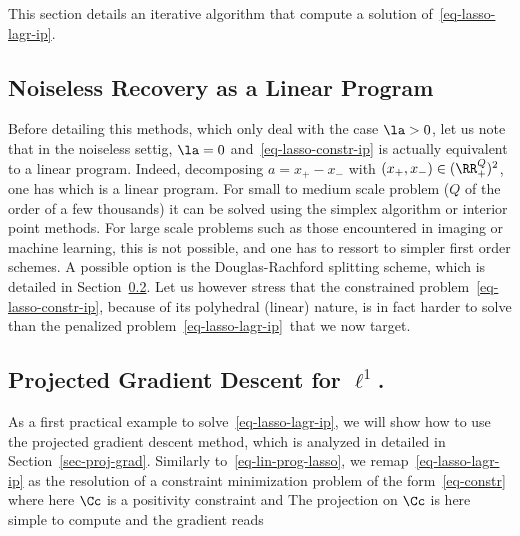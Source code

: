 This section details an iterative algorithm that compute a solution of~\eqref{eq-lasso-lagr-ip}.

\subsection{Noiseless Recovery as a Linear Program}
\label{eq-linearprog-lasso}

Before detailing this methods, which only deal with the case $\la>0$, let us note that in the noiseless settig, $\la=0$ and~\eqref{eq-lasso-constr-ip} is actually equivalent to a linear program. Indeed, decomposing $a=x_+-x_-$ with $(x_+,x_-) \in (\RR_+^Q)^2$, one has
which is a linear program. For small to medium scale problem ($Q$ of the order of a few thousands) it can be solved using the simplex algorithm or interior point methods. 
%
For large scale problems such as those encountered in imaging or machine learning, this is not possible, and one has to ressort to simpler first order schemes. A possible option is the Douglas-Rachford splitting scheme, which is detailed in Section~\ref{}.
%
Let us however stress that the constrained problem~\eqref{eq-lasso-constr-ip}, because of its polyhedral (linear) nature, is in fact harder to solve than the penalized problem~\eqref{eq-lasso-lagr-ip} that we now target. 


\subsection{Projected Gradient Descent for $\ell^1$.}

As a first practical example to solve~\eqref{eq-lasso-lagr-ip}, we will show how to use the projected gradient descent method, which is analyzed in detailed in Section~\ref{sec-proj-grad}.
%
Similarly to~\eqref{eq-lin-prog-lasso}, we remap~\eqref{eq-lasso-lagr-ip} as the resolution of a constraint minimization problem of the form~\eqref{eq-constr} where here $\Cc$ is a positivity constraint and
The projection on $\Cc$ is here simple to compute
and the gradient reads

